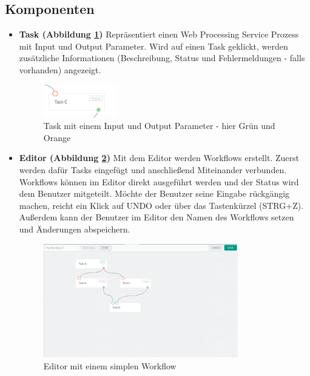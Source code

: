         \subsection{Komponenten}
        
        \begin{itemize}
        
            \item \textbf{Task (Abbildung \ref{fig:Task})} \newline 
            Repräsentiert einen \Gls{Web Processing Service} Prozess mit Input und Output Parameter. Wird auf einen Task geklickt, werden zusätzliche Informationen (Beschreibung, Status und Fehlermeldungen - falls vorhanden) angezeigt.
            
            \begin{figure}[h]
            \centering
            \includegraphics[width=0.3\textwidth]{images/ui_task.png}
            \caption{Task mit einem Input und Output Parameter - hier Grün und Orange}
            \label{fig:Task}
            \end{figure}

            \item \textbf{Editor (Abbildung \ref{fig:Editor})} \newline 
            Mit dem Editor werden Workflows erstellt. Zuerst werden dafür Tasks eingefügt und anschließend Miteinander verbunden.
            Workflows können im Editor direkt ausgeführt werden und der Status wird dem Benutzer mitgeteilt. Möchte der Benutzer seine Eingabe rückgängig machen, reicht ein Klick auf UNDO oder über das Tastenkürzel (STRG+Z).
            Außerdem kann der Benutzer im Editor den Namen des Workflows setzen und Änderungen abspeichern.
            
            \begin{figure}[h]
            \centering
            \includegraphics[width=0.8\textwidth]{images/ui_editor.png}
            \caption{Editor mit einem simplen Workflow}
            \label{fig:Editor}
            \end{figure}
            

\end{itemize}
